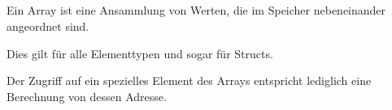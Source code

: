 \subsection{\Conclusion{}}

Ein Array ist eine Ansammlung von Werten, die im Speicher nebeneinander angeordnet sind.

Dies gilt für alle Elementtypen und sogar für Structs.

Der Zugriff auf ein spezielles Element des Arrays entspricht lediglich eine Berechnung von dessen Adresse.


